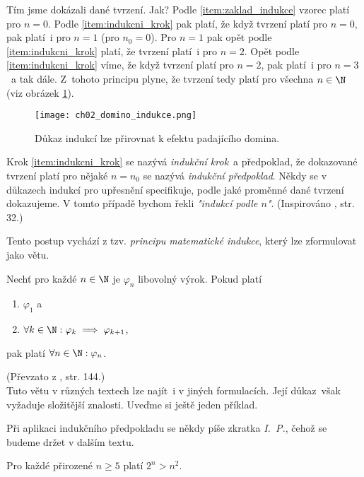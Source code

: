 Tím jsme dokázali dané tvrzení. Jak? Podle \ref{item:zaklad_indukce} vzorec platí pro $n=0$. Podle \ref{item:indukcni_krok} pak platí, že když tvrzení platí pro $n=0$, pak platí~i pro $n=1$ (pro $n_0=0$). Pro $n=1$ pak opět podle \ref{item:indukcni_krok} platí, že tvrzení platí~i pro $n=2$. Opět podle \ref{item:indukcni_krok} víme, že když tvrzení platí pro $n=2$, pak platí~i pro $n=3$~a tak dále. Z~tohoto principu plyne, že tvrzení tedy platí pro všechna $n\in\N$ (viz obrázek \ref{fig:domino}).
\begin{figure}[H]
    \centering
    \texttt{[image: ch02\_domino\_indukce.png]}
    \caption{Důkaz indukcí lze přirovnat k efektu padajícího domina.}
    \label{fig:domino}
\end{figure}
Krok \ref{item:indukcni_krok} se nazývá \emph{indukční krok}~a předpoklad, že dokazované tvrzení platí pro nějaké $n=n_0$ se nazývá \emph{indukční předpoklad}. Někdy se v důkazech indukcí pro upřesnění specifikuje, podle jaké proměnné dané tvrzení dokazujeme. V tomto případě bychom řekli \emph{"indukcí podle $n$"}. (Inspirováno \cite{MatousekNesetril2009}, str. 32.)\par
Tento postup vychází z tzv. \emph{principu matematické indukce}, který lze zformulovat jako větu.
\begin{theorem}
    Nechť pro každé $n\in\N$ je $\varphi_n$ libovolný výrok. Pokud platí
    \begin{enumerate}[label=(\roman*)]
        \item $\varphi_1$ a
        \item $\forall k\in\N: \varphi_k \implies \varphi_{k+1}$,
    \end{enumerate}
    pak platí $\forall n\in\N: \varphi_n$.
\end{theorem}
(Převzato z \cite{ChartrandPolimeniZhang2014}, str. 144.)\\
Tuto větu v různých textech lze najít~i v jiných formulacích. Její důkaz~však vyžaduje složitější znalosti. Uveďme si ještě jeden příklad.
\begin{convention}
    Při aplikaci indukčního předpokladu se někdy píše zkratka \emph{I.~P.}, čehož se budeme držet v dalším textu.
\end{convention}
\begin{proposition}
    Pro každé přirozené $n\geq 5$ platí $2^n>n^2$.
\end{proposition}
